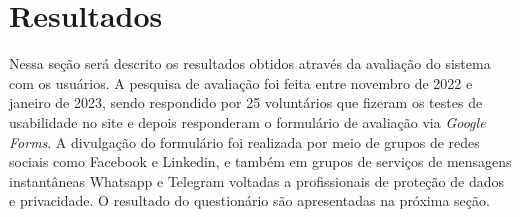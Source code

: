 \documentclass[
	12pt,				%
	openright,			%
	oneside,			%
	a4paper,			%
	english,			%
	french,				%
	spanish,			%
	brazil,				%
	]{abntex2}
\begin{document}
\pagebreak


\chapter{Resultados}
\label{ch: resultados} 

Nessa seção será descrito os resultados obtidos através da avaliação do sistema com os usuários. A pesquisa de avaliação foi feita entre novembro de 2022 e janeiro de 2023, sendo respondido por 25 voluntários que fizeram os testes de usabilidade no site e depois responderam o formulário de avaliação via \textit{Google Forms}. A divulgação do formulário foi realizada por meio de grupos de redes sociais como Facebook e Linkedin, e também em grupos de serviços de mensagens instantâneas Whatsapp e Telegram voltadas a profissionais de proteção de dados e privacidade. O resultado do questionário são apresentadas na próxima seção.
\end{document}
